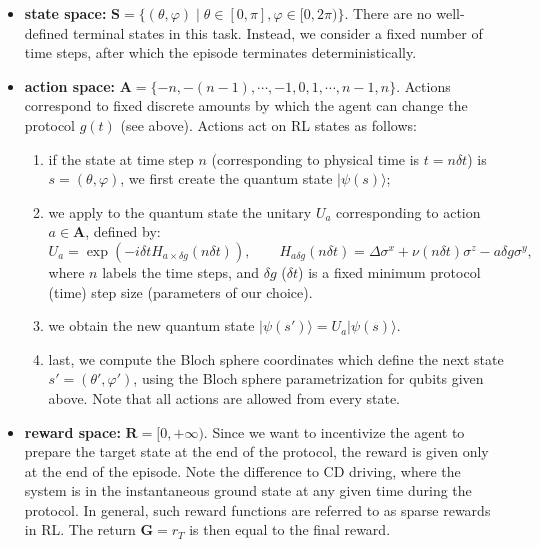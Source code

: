 \begin{itemize}
    \item \textbf{state space:} $\mathbf{S} = \{(\theta,\varphi)\;|\;\theta\in[0,\pi],\varphi\in[0,2\pi)\}$. There are no well-defined terminal states in this task. Instead, we consider a fixed number of time steps, after which the episode terminates deterministically. 

    \item \textbf{action space:} $\mathbf{A} = \{-n,-(n-1),\cdots,-1,0,1,\cdots,n-1,n\}$. Actions correspond to fixed discrete amounts by which the agent can change the protocol $g(t)$ (see above). Actions act on RL states as follows:
    \begin{enumerate}
        \item if the state at time step $n$ (corresponding to physical time is $t=n\delta t$) is $s=(\theta,\varphi)$, we first create the quantum state $|\psi(s)\rangle$; 

        \item we apply to the quantum state the unitary $U_a$ corresponding to action $a\in\mathbf{A}$, defined by:
            \begin{equation}
                 U_a = \exp(-i \delta t H_{a\times\delta g}(n\delta t)),\qquad 
                 H_{a\delta g}(n\delta t) = \Delta\sigma^x + \nu(n\delta t)\sigma^z - a\delta g\sigma^y,
            \end{equation}
        where $n$ labels the time steps, and $\delta g$ ($\delta t$) is a fixed minimum protocol (time) step size (parameters of our choice). 

        \item we obtain the new quantum state $|\psi(s')\rangle = U_a|\psi(s)\rangle$. 

        \item last, we compute the Bloch sphere coordinates which define the next state $s'=(\theta',\varphi')$, using the Bloch sphere parametrization for qubits given above.
        Note that all actions are allowed from every state. 
    \end{enumerate}

    \item \textbf{reward space:} $\mathbf{R}=[0,+\infty)$. 
    Since we want to incentivize the agent to prepare the target state at the end of the protocol, the reward is given only at the end of the episode. Note the difference to CD driving, where the system is in the instantaneous ground state at any given time during the protocol. In general, such reward functions are referred to as sparse rewards in RL. The return $\mathbf G=r_T$ is then equal to the final reward. 
    

\end{itemize}
